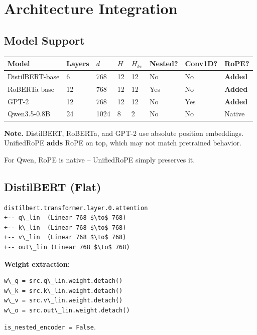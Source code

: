 
\section{Architecture Integration}

\subsection{Model Support}

\begin{table}[H]
\centering
\small
\begin{tabular}{llllllll}
\toprule
\textbf{Model} & \textbf{Layers} & \textbf{$d$} & \textbf{$H$} & \textbf{$H_{kv}$} & \textbf{Nested?} & \textbf{Conv1D?} & \textbf{RoPE?} \\
\midrule
DistilBERT-base & 6 & 768 & 12 & 12 & No & No & \textbf{Added} \\
RoBERTa-base & 12 & 768 & 12 & 12 & Yes & No & \textbf{Added} \\
GPT-2 & 12 & 768 & 12 & 12 & No & Yes & \textbf{Added} \\
Qwen3.5-0.8B & 24 & 1024 & 8 & 2 & No & No & Native \\
\bottomrule
\end{tabular}
\end{table}

\textbf{Note.} DistilBERT, RoBERTa, and GPT-2 use absolute position embeddings. 
UnifiedRoPE \textbf{adds} RoPE on top, which may not match pretrained behavior.

For Qwen, RoPE is native -- UnifiedRoPE simply preserves it.

\subsection{DistilBERT (Flat)}

\begin{lstlisting}
distilbert.transformer.layer.0.attention
+-- q\_lin  (Linear 768 $\to$ 768)
+-- k\_lin  (Linear 768 $\to$ 768)
+-- v\_lin  (Linear 768 $\to$ 768)
+-- out\_lin (Linear 768 $\to$ 768)
\end{lstlisting}

\textbf{Weight extraction:}
\begin{lstlisting}
w\_q = src.q\_lin.weight.detach()
w\_k = src.k\_lin.weight.detach()
w\_v = src.v\_lin.weight.detach()
w\_o = src.out\_lin.weight.detach()
\end{lstlisting}

\texttt{is\_nested\_encoder = False}.

